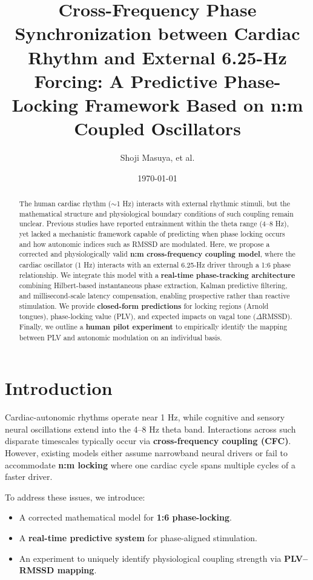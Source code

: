 \documentclass[fleqn,10pt]{article}
\title{\textbf{Cross-Frequency Phase Synchronization between Cardiac Rhythm and External 6.25-Hz Forcing: A Predictive Phase-Locking Framework Based on n:m Coupled Oscillators}}
\author{Shoji Masuya, et al.}
\date{\today}
\begin{document}
\maketitle

\begin{abstract}
The human cardiac rhythm ($\sim$1 Hz) interacts with external rhythmic stimuli, but the mathematical structure and physiological boundary conditions of such coupling remain unclear. Previous studies have reported entrainment within the theta range (4--8 Hz), yet lacked a mechanistic framework capable of predicting when phase locking occurs and how autonomic indices such as RMSSD are modulated. 
Here, we propose a corrected and physiologically valid \textbf{n:m cross-frequency coupling model}, where the cardiac oscillator (1 Hz) interacts with an external 6.25-Hz driver through a 1:6 phase relationship. We integrate this model with a \textbf{real-time phase-tracking architecture} combining Hilbert-based instantaneous phase extraction, Kalman predictive filtering, and millisecond-scale latency compensation, enabling prospective rather than reactive stimulation. 
We provide \textbf{closed-form predictions} for locking regions (Arnold tongues), phase-locking value (PLV), and expected impacts on vagal tone ($\Delta$RMSSD). Finally, we outline a \textbf{human pilot experiment} to empirically identify the mapping between PLV and autonomic modulation on an individual basis.
\end{abstract}

\section{Introduction}
Cardiac-autonomic rhythms operate near 1 Hz, while cognitive and sensory neural oscillations extend into the 4--8 Hz theta band. Interactions across such disparate timescales typically occur via \textbf{cross-frequency coupling (CFC)}. However, existing models either assume narrowband neural drivers or fail to accommodate \textbf{n:m locking} where one cardiac cycle spans multiple cycles of a faster driver. 

To address these issues, we introduce:
\begin{itemize}
    \item A corrected mathematical model for \textbf{1:6 phase-locking}.
    \item A \textbf{real-time predictive system} for phase-aligned stimulation.
    \item An experiment to uniquely identify physiological coupling strength via \textbf{PLV--RMSSD mapping}.
\end{itemize}
\end{document}

